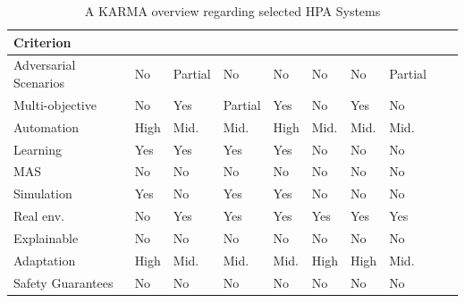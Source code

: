 \documentclass[conference]{IEEEtran}
\begin{document}
\begin{table}[h!]
    \centering
    \caption{A KARMA overview regarding selected HPA Systems}
    \label{tab:autoscaling_criteria}
    {\footnotesize
    \renewcommand{\arraystretch}{1.1}
    \begin{tabular}{>{\raggedright\arraybackslash}m{1.3cm}>{\centering\arraybackslash}m{0.6cm}>{\centering\arraybackslash}m{0.6cm}>{\centering\arraybackslash}m{0.6cm}>{\centering\arraybackslash}m{0.6cm}>{\centering\arraybackslash}m{0.6cm}>{\centering\arraybackslash}m{0.6cm}>{\centering\arraybackslash}m{0.6cm}>{\centering\arraybackslash}m{0.6cm}>{\centering\arraybackslash}m{0.6cm}}
    \hline
    \textbf{Criterion} & \vspace{-0.3cm}\textbf{\cite{gymhpa2022}} & \vspace{-0.3cm}\textbf{\cite{aware2023}} & \vspace{-0.3cm}\textbf{\cite{Rossi2019}} & \vspace{-0.3cm}\textbf{\cite{QoSRL}} & \vspace{-0.3cm}\textbf{\cite{Zhou2024}} & \vspace{-0.3cm}\textbf{\cite{KOSMOS}} & \vspace{-0.3cm}\textbf{\cite{COPA}} \\
    \hline
    \hline
    Adversarial Scenarios & No & Partial & No & No & No & No & Partial \\
    \hline
    Multi-objective & No & Yes & Partial & Yes & No & Yes & No \\
    \hline
    Automation & High & Mid. & Mid. & High & Mid. & Mid. & Mid. \\
    \hline
    Learning & Yes & Yes & Yes & Yes & No & No & No \\
    \hline
    MAS & No & No & No & No & No & No & No \\
    \hline
    Simulation & Yes & No & Yes & Yes & No & No & No \\
    \hline
    Real env. & No & Yes & Yes & Yes & Yes & Yes & Yes \\
    \hline
    Explainable & No & No & No & No & No & No & No \\
    \hline
    Adaptation & High & Mid. & Mid. & Mid. & High & High & Mid. \\
    \hline
    Safety Guarantees & No & No & No & No & No & No & No \\
    \hline
    \end{tabular}%
    }
  \end{table}
\end{document}
